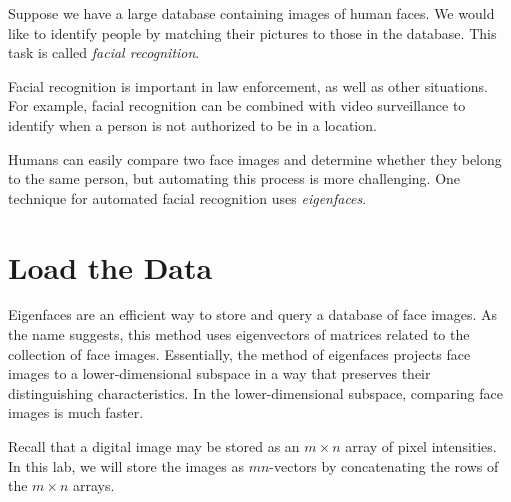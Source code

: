 \label{lab:FacialRecognition}


Suppose we have a large database containing images of human faces.
We would like to identify people by matching their pictures to those in the database.
This task is called \emph{facial recognition}.

Facial recognition is important in law enforcement, as well as other situations. 
For example, facial recognition can be combined with video surveillance to identify when a person is not authorized to be in a location.

Humans can easily compare two face images and determine whether they belong to the same person, but automating this process is more challenging.
One technique for automated facial recognition uses \emph{eigenfaces}.

\section*{Load the Data}
Eigenfaces are an efficient way to store and query a database of face images.
As the name suggests, this method uses eigenvectors of matrices related to the collection of face images.
Essentially, the method of eigenfaces projects face images to a lower-dimensional subspace in a way that preserves their distinguishing characteristics. 
In the lower-dimensional subspace, comparing face images is much faster.

Recall that a digital image may be stored as an $m \times n$ array of pixel intensities. 
In this lab, we will store the images as $mn$-vectors by concatenating the rows of the $m \times n$ arrays.

